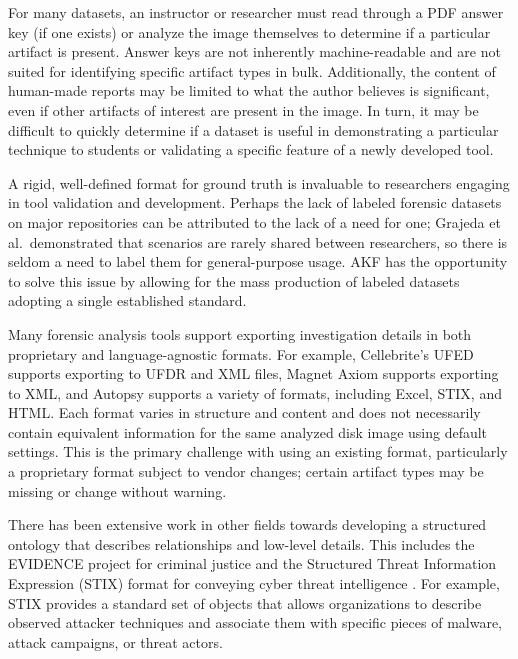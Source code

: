 \documentclass[letterpaper,12pt]{report}
\begin{document}
For many datasets, an instructor or researcher must read through a PDF
answer key (if one exists) or analyze the image themselves to determine
if a particular artifact is present. Answer keys are not inherently
machine-readable and are not suited for identifying specific artifact
types in bulk. Additionally, the content of human-made reports may be
limited to what the author believes is significant, even if other
artifacts of interest are present in the image. In turn, it may be
difficult to quickly determine if a dataset is useful in demonstrating a
particular technique to students or validating a specific feature of a
newly developed tool.

A rigid, well-defined format for ground truth is invaluable to
researchers engaging in tool validation and development. Perhaps the
lack of labeled forensic datasets on major repositories can be
attributed to the lack of a need for one; Grajeda et al.~demonstrated
that scenarios are rarely shared between researchers, so there is seldom
a need to label them for general-purpose usage. AKF has the opportunity
to solve this issue by allowing for the mass production of labeled
datasets adopting a single established standard.

Many forensic analysis tools support exporting investigation details in
both proprietary and language-agnostic formats. For example,
Cellebrite's UFED supports exporting to UFDR and XML files, Magnet Axiom
supports exporting to XML, and Autopsy supports a variety of formats,
including Excel, STIX, and HTML. Each format varies in structure and
content and does not necessarily contain equivalent information for the
same analyzed disk image using default settings. This is the primary
challenge with using an existing format, particularly a proprietary
format subject to vendor changes; certain artifact types may be missing
or change without warning.

There has been extensive work in other fields towards developing a
structured ontology that describes relationships and low-level details.
This includes the EVIDENCE project for criminal justice and the
Structured Threat Information Expression (STIX) format for conveying
cyber threat intelligence
\cite{caseyLeveragingCybOXStandardize2015}. For example, STIX
provides a standard set of objects that allows organizations to describe
observed attacker techniques and associate them with specific pieces of
malware, attack campaigns, or threat actors.
\end{document}
